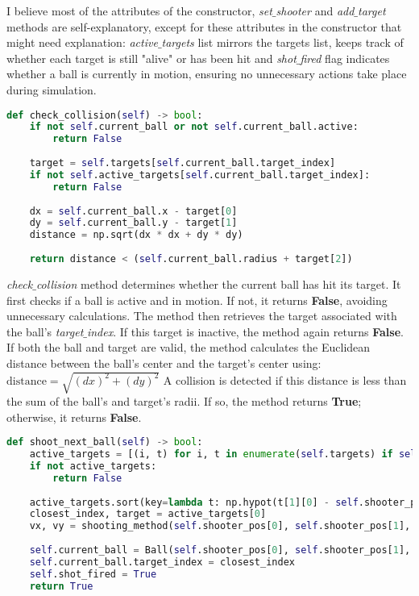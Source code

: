 \documentclass{article}
\begin{document}
	I believe most of the attributes of the constructor, \textit{set$\_$shooter}  and \textit{add$\_$target} methods are self-explanatory, except for these attributes in the constructor that might need explanation:  \textit{active$\_$targets} list mirrors the targets list, keeps track of whether each target is still "alive" or has been hit and \textit{shot$\_$fired} flag indicates whether a ball is currently in motion, ensuring no unnecessary actions take place during simulation. 
	
\begin{lstlisting}[language=python]
def check_collision(self) -> bool:
	if not self.current_ball or not self.current_ball.active:
		return False
	
	target = self.targets[self.current_ball.target_index]
	if not self.active_targets[self.current_ball.target_index]:
		return False
	
	dx = self.current_ball.x - target[0]
	dy = self.current_ball.y - target[1]
	distance = np.sqrt(dx * dx + dy * dy)
	
	return distance < (self.current_ball.radius + target[2])
\end{lstlisting}

\textit{check$\_$collision} method determines whether the current ball has hit its target. It first checks if a ball is active and in motion. If not, it returns \textbf{False}, avoiding unnecessary calculations. 
The method then retrieves the target associated with the ball’s \textit{target$\_$index}. If this target is inactive, the method again returns \textbf{False}.
If both the ball and target are valid, the method calculates the Euclidean distance between the ball's center and the target's center using: $\text{distance} = \sqrt{(dx)^2 + (dy)^2}$
A collision is detected if this distance is less than the sum of the ball’s and target’s radii. If so, the method returns \textbf{True}; otherwise, it returns \textbf{False}.

\begin{lstlisting}[language=python]
def shoot_next_ball(self) -> bool:
	active_targets = [(i, t) for i, t in enumerate(self.targets) if self.active_targets[i]]
	if not active_targets:
		return False
	
	active_targets.sort(key=lambda t: np.hypot(t[1][0] - self.shooter_pos[0], t[1][1] - self.shooter_pos[1]))
	closest_index, target = active_targets[0]
	vx, vy = shooting_method(self.shooter_pos[0], self.shooter_pos[1], target[0], target[1], self.params)
	
	self.current_ball = Ball(self.shooter_pos[0], self.shooter_pos[1], vx, vy)
	self.current_ball.target_index = closest_index
	self.shot_fired = True
	return True
\end{lstlisting}
\end{document}
